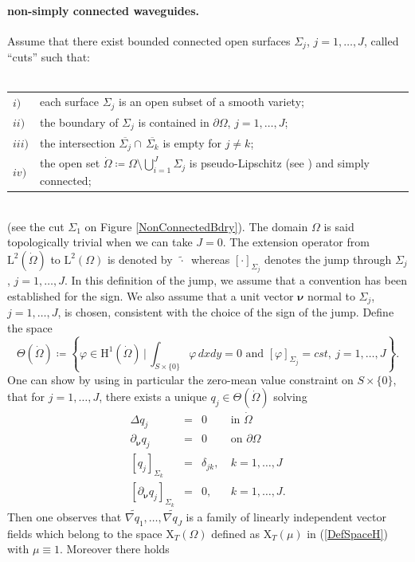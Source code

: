 \documentclass[11pt,a4paper]{article}
\newcommand{\dsp}{\displaystyle}
\newcommand{\Om}{\Omega}
\newcommand{\mrm}[1]{\mathrm{#1}}
\newcommand{\bfnu}{\boldsymbol{\nu}}
\newcommand{\mX}{\mrm{X}}
\begin{document}
\paragraph{non-simply connected waveguides.}
\noindent Assume that there exist bounded connected open
surfaces $\Sigma_j$, $j=1,\dots, J$, called ``cuts'' such that:\\[3pt]
~\hspace{0.5cm}\begin{tabular}{ll}
$i)$ & each surface $\Sigma_j$ is an open subset of a smooth variety;\\
$ii)$ & the boundary of $\Sigma_j$ is contained in $\partial\Om$, $j=1,\dots, J$;\\
$iii)$ & the intersection $\overline{\Sigma_j}\cap\,\overline{\Sigma_k}$ is empty for $j\ne k$;\\
$iv)$ & the open set $\dot{\Om}\coloneqq\Omega\setminus\bigcup_{i=1}^{J}\Sigma_j$ is pseudo-Lipschitz (see \cite[Def.\,3.1]{ABDG98}) and simply connected;
\end{tabular}\\[5pt]
(see the cut $\Sigma_1$ on Figure \ref{NonConnectedBdry}). The domain $\Omega$ is said topologically trivial when we can take  $J=0$. The extension operator from $\mrm{L}^2(\dot\Omega)$ to $\mrm{L}^2(\Omega)$ is denoted by $\ \widetilde{\cdot}\,$ whereas $[\cdot]_{\Sigma_j}$ denotes the jump through $\Sigma_j$, $j=1,\dots, J$. In this definition of the jump, we assume that a convention has been established for the sign. We also assume that a unit vector $\bfnu$ normal to $\Sigma_j$, $j=1,\dots, J$, is chosen, consistent with the choice of the sign of the jump. Define the space
\[
\Theta(\dot\Omega)\coloneqq\dsp\left\{\varphi\in\mrm{H}^1(\dot\Omega)\,|\,
\int_{S\times\{0\}}\varphi\,dxdy=0\mbox{ and }
[\varphi]_{\Sigma_j}=cst,\ j=1,\dots, J\right\}. 
\]
One can show by using in particular the zero-mean value constraint on $S\times\{0\}$, that for $j=1,\dots, J$, there exists a unique $q_j\in\Theta(\dot\Omega)$ solving
\[
\begin{array}{|rcll}
\Delta q_j  & = & 0 & \ \mbox{in }\dot\Om \\[2pt]
\partial_{\bfnu} q_j & = & 0 & \ \mbox{on }\partial\Om \\[2pt]
\left[q_j\right]_{\Sigma_k} & = &\delta_{jk}, &  \ k=1,\dots, J\\[2pt]
\left[\partial_{\bfnu} q_j\right]_{\Sigma_k} & = & 0, &  \ k=1,\dots, J.
\end{array}
\]
Then one observes that $\widetilde{\nabla q_1},\dots,\widetilde{\nabla q_J}$ is a family of linearly independent vector fields which belong to the space $\boldsymbol{\mX}_T(\Om)$ defined as $\boldsymbol{\mX}_T(\mu)$ in (\ref{DefSpaceH}) with $\mu\equiv1$. Moreover there holds 
\end{document}

